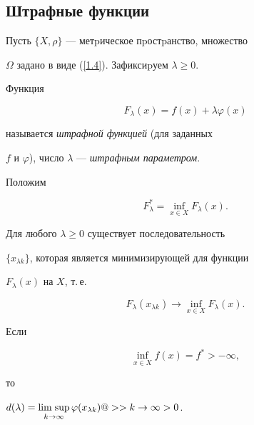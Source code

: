 \subsection{Штрафные функции}\label{ss1.3}





Пусть $\{X,\rho \}$ --- метpическое пpостpанство, множество


$\Omega$ задано в виде (\ref{1.4}). Зафиксиpуем $\lambda\geq 0$. 


Функция


\begin{equation}\label{3.1}


F_{\lambda}(x) = f(x) + \lambda\varphi(x)


\end{equation}


называется {\it штрафной функцией} (для заданных


$f$ и $\varphi$), число $\lambda$ --- {\it штрафным параметром}.


Положим


$$




F^{*}_{\lambda} = \inf\limits_{x\in X}F_{\lambda}(x).




$$


Для любого $\lambda\geq 0$ существует последовательность


$\{x_{\lambda k }\}$, которая является минимизирующей для функции


$F_{\lambda}(x)$ на $X$, т.\,е.


$$




F_{\lambda}(x_{\lambda k})\longrightarrow\inf\limits_{x\in


X}F_{\lambda}(x).




$$





\begin{lems}\label{L3.1}


Если


\begin{equation}\label{3.4}


\inf\limits_{x\in X}f(x) = f^{*} > -\infty,


\end{equation}


то 




$d(\lambda) = \Limsup\limits_{k\rightarrow \infty}\varphi(x_{\lambda


k}) @>>{k\to\infty}>0$.


\end{lems}





